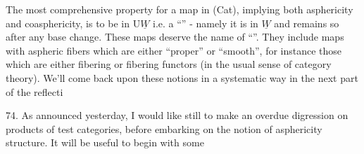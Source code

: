 The most comprehensive property  for a map in (Cat),
implying both asphericity and coasphericity, is to be in U$\underline{W}$ i.e. a
``\hand{\uline{\textcolor{black}{universal weak equivalence}}}'' - namely it is in $\underline{W}$ and remains so after
any base change. These maps deserve the name of ``\hand{\uline{\textcolor{black}{trivial Serre fibrati-%
ons}}}''. They include maps with aspheric fibers which are either ``proper''
or ``smooth'', for instance those which are either fibering or fibering
functors (in the usual sense of category theory). We'll come back upon
these notions in a  systematic way in the next part of the reflecti

74. As announced yesterday, I would like still to make an overdue
digression on products of test categories, before embarking on the
notion of asphericity structure. It will be useful to begin with some

